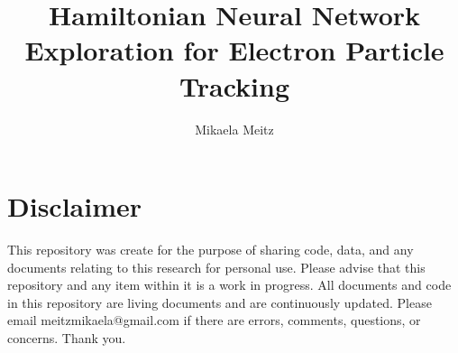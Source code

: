 \documentclass{article}
\title{Hamiltonian Neural Network Exploration for Electron Particle Tracking }
\author{Mikaela Meitz}
\begin{document}
\maketitle
\section{Disclaimer}
This repository was create for the purpose of sharing code, data, and any documents relating to this research for personal use. Please advise that this repository and any item within it is a work in progress. All documents and code in this repository are living documents and are continuously updated. 
\newline
\newline
Please email meitzmikaela@gmail.com if there are errors, comments, questions, or concerns. 
\newline
Thank you. 
\end{document}
